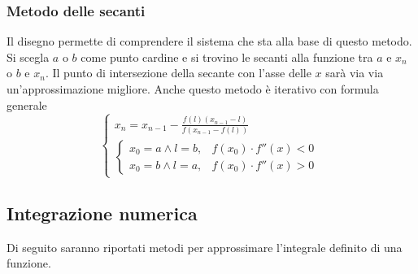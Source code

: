 \subsubsection{Metodo delle secanti}
\begin{center}
\end{center}
Il disegno permette di comprendere il sistema che sta alla base di questo metodo. Si scegla $a$ o 
$b$ come punto cardine e si trovino le secanti alla funzione tra $a$ e $x_n$ o $b$ e $x_n$. Il
punto di intersezione della secante con l'asse delle $x$ sarà via via un'approssimazione migliore.
Anche questo metodo è iterativo con formula generale
\begin{equation*}
  \begin{cases}
    x_n=x_{n-1} - \frac{f(l)(x_{n-1}-l)}{f(x_{n-1}-f(l))}\\
    \begin{cases}
      x_0=a\land l=b, & f(x_0)\cdot f''(x) < 0\\
      x_0=b\land l=a, & f(x_0)\cdot f''(x) > 0
    \end{cases}
  \end{cases}
\end{equation*}

\subsection{Integrazione numerica}
Di seguito saranno riportati metodi per approssimare l'integrale definito di una funzione.

